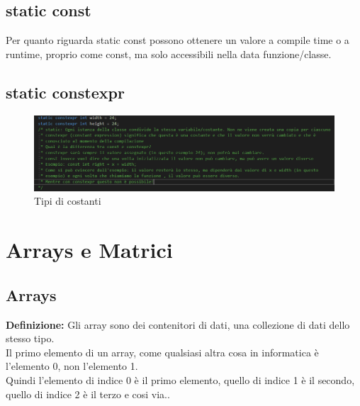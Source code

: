 \subsection{static const}

\textsf{\small Per quanto riguarda \color{myblue2} static const \normalcolor possono ottenere un valore a compile time o a runtime, proprio come \color{myblue2} const, \normalcolor ma solo accessibili nella data funzione/classe.}\\

\subsection{static constexpr}


\begin{figure}[ht]
	\centering
	\includegraphics[width=1.2\textwidth, height=1.2\textheight, keepaspectratio]{./imgs/constexpr_e_const_differenze.png}
	\caption{Tipi di costanti}
	\label{fig:constants}
\end{figure}


\section{Arrays e Matrici}

\subsection{Arrays}

\textsf{\small \textbf{Definizione: } Gli array sono dei contenitori di dati, una collezione di dati dello stesso tipo.} \\

\textsf{\small Il primo elemento di un array, come qualsiasi altra cosa in informatica è l'elemento 0, non l'elemento 1.}\\

\textsf{\small Quindi l'elemento di indice 0 è il primo elemento, quello di indice 1 è il secondo, quello di indice 2 è il terzo e cosi via..} \\

